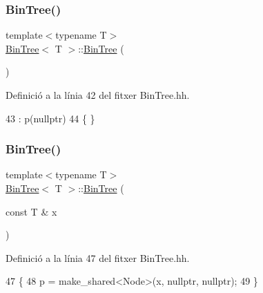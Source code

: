 \subsubsection{\texorpdfstring{Bin\+Tree()}{BinTree()}\hspace{0.1cm}{\footnotesize\ttfamily [1/3]}}
{\footnotesize\ttfamily template$<$typename T$>$ \\
\hyperlink{class_bin_tree}{Bin\+Tree}$<$ T $>$\+::\hyperlink{class_bin_tree}{Bin\+Tree} (\begin{DoxyParamCaption}{ }\end{DoxyParamCaption})}



Definició a la línia 42 del fitxer Bin\+Tree.\+hh.


\begin{DoxyCode}
43     :   p(\textcolor{keyword}{nullptr})
44     \{   \}
\end{DoxyCode}
\mbox{\label{class_bin_tree_a1ab686e0bcf990093ff91fe71744c1a4}} 
\subsubsection{\texorpdfstring{Bin\+Tree()}{BinTree()}\hspace{0.1cm}{\footnotesize\ttfamily [2/3]}}
{\footnotesize\ttfamily template$<$typename T$>$ \\
\hyperlink{class_bin_tree}{Bin\+Tree}$<$ T $>$\+::\hyperlink{class_bin_tree}{Bin\+Tree} (\begin{DoxyParamCaption}\item[{const T \&}]{x }\end{DoxyParamCaption})}



Definició a la línia 47 del fitxer Bin\+Tree.\+hh.


\begin{DoxyCode}
47                          \{
48         p = make\_shared<Node>(x, \textcolor{keyword}{nullptr}, \textcolor{keyword}{nullptr});
49     \}
\end{DoxyCode}
\mbox{\label{class_bin_tree_adb7eeff76d08130c943b36af215eb521}} 
